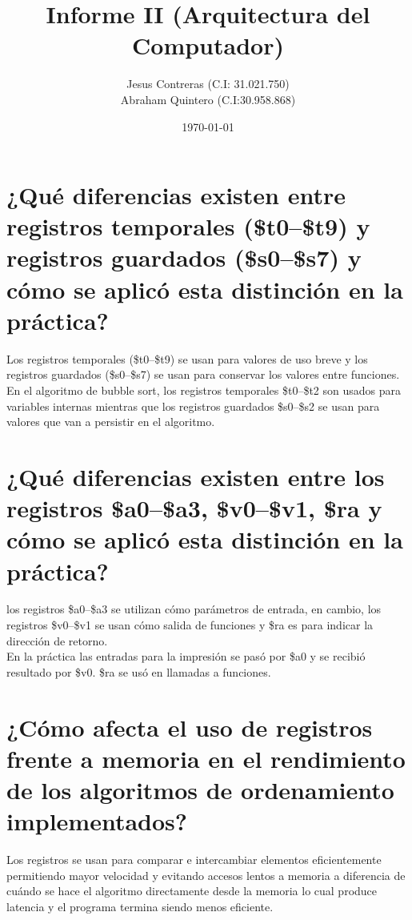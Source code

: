 \documentclass[12pt]{article}
\title{Informe II (Arquitectura del Computador)}
\author{Jesus Contreras (C.I: 31.021.750)\\Abraham Quintero (C.I:30.958.868)}
\date{\today}
\begin{document}
\maketitle

\section{¿Qué diferencias existen entre registros temporales (\$t0--\$t9) y registros guardados (\$s0--\$s7) y cómo se aplicó esta distinción en la práctica?}
\begin{itemize}
    Los registros temporales (\$t0--\$t9) se usan para valores de uso breve y los registros guardados (\$s0--\$s7) se usan para conservar los valores entre funciones.
    \\En el algoritmo de bubble sort, los registros temporales \$t0--\$t2 son usados para variables internas mientras que los registros guardados \$s0--\$s2 se usan para valores que van a persistir en el algoritmo.
\end{itemize}

\section{¿Qué diferencias existen entre los registros \$a0–\$a3, \$v0–\$v1, \$ra y cómo se aplicó esta distinción en la práctica?}

\begin{itemize}
     los registros \$a0--\$a3 se utilizan cómo parámetros de entrada, en cambio, los registros \$v0--\$v1 se usan cómo salida de funciones y \$ra es para indicar la dirección de retorno.\\ 
   
   En la práctica las entradas para la impresión se pasó por \$a0 y se recibió resultado por \$v0. \$ra se usó en llamadas a funciones.
\end{itemize}

\section {¿Cómo afecta el uso de registros frente a memoria en el rendimiento de los algoritmos 
de ordenamiento implementados?}
\begin{itemize}
    Los registros se usan para comparar e intercambiar elementos eficientemente permitiendo mayor velocidad y evitando accesos lentos a memoria a diferencia de cuándo se hace el algoritmo directamente desde la memoria lo cual produce latencia y el programa termina siendo menos eficiente.
\end{itemize}
\end{document}
